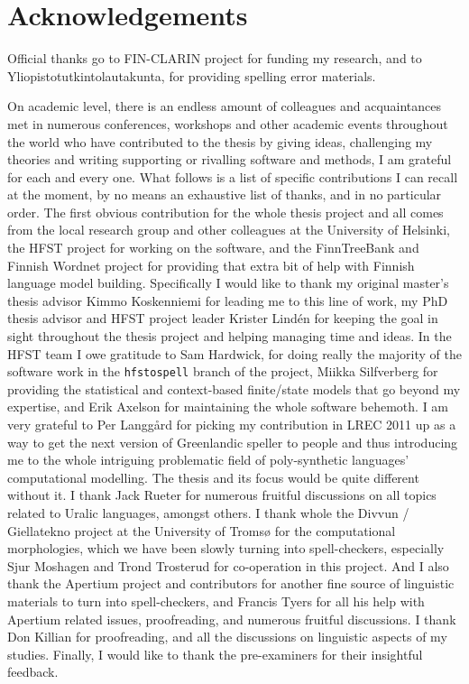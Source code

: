 \documentclass[officiallayout]{unihelcompling}
\begin{document}
\section*{Acknowledgements}
\label{sec:acknowledgements}

Official thanks go to FIN-CLARIN project for funding my research, and to
Yliopistotutkintolautakunta, for providing spelling error materials.

On academic level, there is an endless amount of colleagues and acquaintances
met in numerous conferences, workshops and other academic events throughout the
world who have contributed to the thesis by giving ideas, challenging my
theories and writing supporting or rivalling software and methods, I am
grateful for each and every one. What follows is a list of specific
contributions I can recall at the moment, by no means an exhaustive list of
thanks, and in no particular order.  The first obvious contribution for the
whole thesis project and all comes from the local research group and other
colleagues at the University of Helsinki, the HFST project for working on the
software, and the FinnTreeBank and Finnish Wordnet project for providing that
extra bit of help with Finnish language model building. Specifically I would
like to thank my original master's thesis advisor Kimmo Koskenniemi for leading
me to this line of work, my PhD thesis advisor and HFST project leader Krister
Lindén for keeping the goal in sight throughout the thesis project and helping
managing time and ideas.  In the HFST team I owe gratitude to Sam Hardwick, for
doing really the majority of the software work in the \texttt{hfstospell}
branch of the project, Miikka Silfverberg for providing the statistical and
context-based finite\-/state models that go beyond my expertise, and Erik
Axelson for maintaining the whole software behemoth.  I am very grateful to Per
Langgård for picking my contribution in LREC 2011 up as a way to get the next
version of Greenlandic speller to people and thus introducing me to the whole
intriguing problematic field of poly-synthetic languages' computational
modelling. The thesis and its focus would be quite different without it.  I
thank Jack Rueter for numerous fruitful discussions on all topics related to
Uralic languages, amongst others.  I thank whole the Divvun / Giellatekno
project at the University of Tromsø for the computational morphologies, which
we have been slowly turning into spell-checkers, especially Sjur Moshagen and
Trond Trosterud for co-operation in this project. And I also thank the Apertium
project and contributors for another fine source of linguistic materials to
turn into spell-checkers, and Francis Tyers for all his help with Apertium
related issues, proofreading, and numerous fruitful discussions. I thank Don
Killian for proofreading, and all the discussions on linguistic aspects of
my studies. Finally, I would like to thank the pre-examiners for their
insightful feedback.
\end{document}
